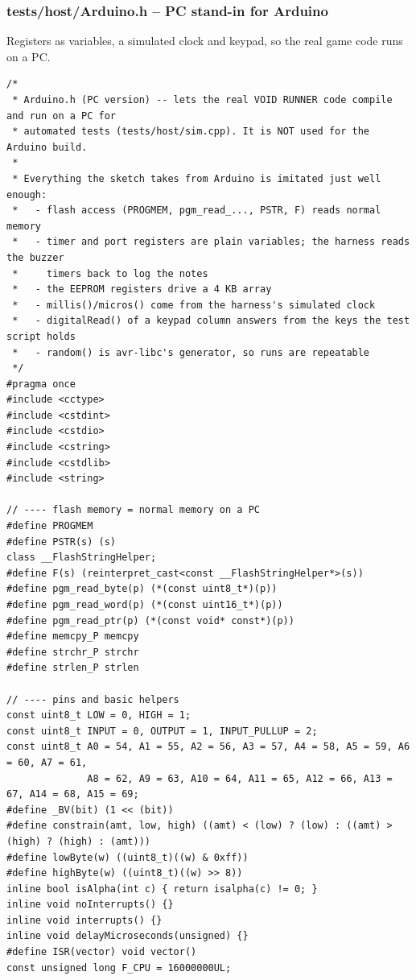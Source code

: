 \documentclass[11pt,a4paper]{article}
\begin{document}
\subsubsection*{tests/host/Arduino.h – PC stand-in for Arduino}
Registers as variables, a simulated clock and keypad, so the real game code runs on a PC.

\begin{lstlisting}[language=Arduino]
/*
 * Arduino.h (PC version) -- lets the real VOID RUNNER code compile and run on a PC for
 * automated tests (tests/host/sim.cpp). It is NOT used for the Arduino build.
 *
 * Everything the sketch takes from Arduino is imitated just well enough:
 *   - flash access (PROGMEM, pgm_read_..., PSTR, F) reads normal memory
 *   - timer and port registers are plain variables; the harness reads the buzzer
 *     timers back to log the notes
 *   - the EEPROM registers drive a 4 KB array
 *   - millis()/micros() come from the harness's simulated clock
 *   - digitalRead() of a keypad column answers from the keys the test script holds
 *   - random() is avr-libc's generator, so runs are repeatable
 */
#pragma once
#include <cctype>
#include <cstdint>
#include <cstdio>
#include <cstring>
#include <cstdlib>
#include <string>

// ---- flash memory = normal memory on a PC
#define PROGMEM
#define PSTR(s) (s)
class __FlashStringHelper;
#define F(s) (reinterpret_cast<const __FlashStringHelper*>(s))
#define pgm_read_byte(p) (*(const uint8_t*)(p))
#define pgm_read_word(p) (*(const uint16_t*)(p))
#define pgm_read_ptr(p) (*(const void* const*)(p))
#define memcpy_P memcpy
#define strchr_P strchr
#define strlen_P strlen

// ---- pins and basic helpers
const uint8_t LOW = 0, HIGH = 1;
const uint8_t INPUT = 0, OUTPUT = 1, INPUT_PULLUP = 2;
const uint8_t A0 = 54, A1 = 55, A2 = 56, A3 = 57, A4 = 58, A5 = 59, A6 = 60, A7 = 61,
              A8 = 62, A9 = 63, A10 = 64, A11 = 65, A12 = 66, A13 = 67, A14 = 68, A15 = 69;
#define _BV(bit) (1 << (bit))
#define constrain(amt, low, high) ((amt) < (low) ? (low) : ((amt) > (high) ? (high) : (amt)))
#define lowByte(w) ((uint8_t)((w) & 0xff))
#define highByte(w) ((uint8_t)((w) >> 8))
inline bool isAlpha(int c) { return isalpha(c) != 0; }
inline void noInterrupts() {}
inline void interrupts() {}
inline void delayMicroseconds(unsigned) {}
#define ISR(vector) void vector()
const unsigned long F_CPU = 16000000UL;


\end{lstlisting}
\end{document}
